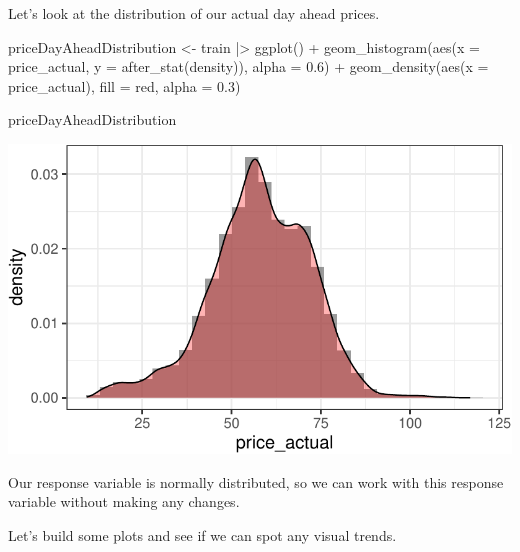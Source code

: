 \documentclass[
]{article}
\newenvironment{Shaded}{\begin{snugshade}}{\end{snugshade}}
\newcommand{\AttributeTok}[1]{\textcolor[rgb]{0.40,0.45,0.13}{#1}}
\newcommand{\FloatTok}[1]{\textcolor[rgb]{0.68,0.00,0.00}{#1}}
\newcommand{\FunctionTok}[1]{\textcolor[rgb]{0.28,0.35,0.67}{#1}}
\newcommand{\NormalTok}[1]{\textcolor[rgb]{0.00,0.23,0.31}{#1}}
\newcommand{\OtherTok}[1]{\textcolor[rgb]{0.00,0.23,0.31}{#1}}
\newcommand{\SpecialCharTok}[1]{\textcolor[rgb]{0.37,0.37,0.37}{#1}}
\newcommand{\StringTok}[1]{\textcolor[rgb]{0.13,0.47,0.30}{#1}}
\begin{document}
Let's look at the distribution of our actual day ahead prices.

\begin{Shaded}
\begin{Highlighting}[]
\NormalTok{priceDayAheadDistribution }\OtherTok{\textless{}{-}}\NormalTok{ train }\SpecialCharTok{|\textgreater{}}
  \FunctionTok{ggplot}\NormalTok{() }\SpecialCharTok{+}
  \FunctionTok{geom\_histogram}\NormalTok{(}\FunctionTok{aes}\NormalTok{(}\AttributeTok{x =}\NormalTok{ price\_actual, }\AttributeTok{y =} \FunctionTok{after\_stat}\NormalTok{(density)), }\AttributeTok{alpha =} \FloatTok{0.6}\NormalTok{) }\SpecialCharTok{+}
  \FunctionTok{geom\_density}\NormalTok{(}\FunctionTok{aes}\NormalTok{(}\AttributeTok{x =}\NormalTok{ price\_actual), }\AttributeTok{fill =} \StringTok{\textquotesingle{}red\textquotesingle{}}\NormalTok{, }\AttributeTok{alpha =} \FloatTok{0.3}\NormalTok{)}

\NormalTok{priceDayAheadDistribution}
\end{Highlighting}
\end{Shaded}

\includegraphics{Analytics_Report_files/figure-pdf/priceDayAheadDistribution-1.pdf}

Our response variable is normally distributed, so we can work with this
response variable without making any changes.

Let's build some plots and see if we can spot any visual trends.
\end{document}
